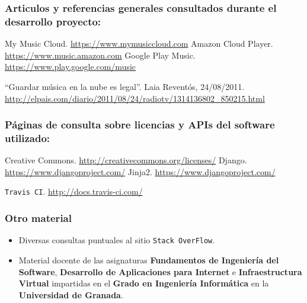 
\subsubsection*{Articulos y referencias generales consultados durante el desarrollo proyecto:}

 My Music Cloud. \url{https://www.mymusiccloud.com}
 Amazon Cloud Player. \url{https://www.music.amazon.com}
 Google Play Music. \url{https://www.play.google.com/music}

 ``Guardar música en la nube es legal''. Laia Reventós, 24/08/2011. \url{http://elpais.com/diario/2011/08/24/radiotv/1314136802_850215.html}

\bigskip


\subsubsection*{Páginas de consulta sobre licencias y APIs del software utilizado:}
 Creative Commons. \url{http://creativecommons.org/licenses/}
 Django. \url{https://www.djangoproject.com/}
 Jinja2. \url{https://www.djangoproject.com/}

 {\tt Travis CI}. \url{http://docs.travis-ci.com/}

\bigskip


\subsubsection*{Otro material}
\begin{itemize}
	\item Diversas consultas puntuales al sitio {\tt Stack OverFlow}.
	\item Material docente de las asignaturas \textbf{Fundamentos de Ingeniería del Software}, \textbf{Desarrollo de Aplicaciones para Internet} e \textbf{Infraestructura Virtual} impartidas en el \textbf{Grado en Ingeniería Informática} en la \textbf{Universidad de Granada}.
\end{itemize}
